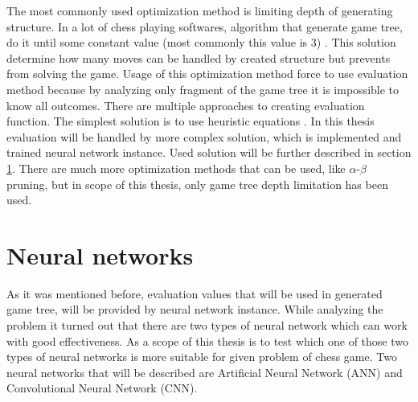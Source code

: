     The most commonly used optimization method is limiting depth of generating structure. In a lot of chess playing softwares, algorithm that generate game tree, do it until some constant value (most commonly this value is $3$) \cite{bib:internet-alphazero,bib:book-search-for-solutions-in-games,bib:article-optimal-on-game-trees}. This solution determine how many moves can be handled by created structure but prevents from solving the game. Usage of this optimization method force to use evaluation method because by analyzing only fragment of the game tree it is impossible to know all outcomes. There are multiple approaches to creating evaluation function. The simplest solution is to use heuristic equations \cite{bib:conference-heuristic-evaluation-chessai}. In this thesis evaluation will be handled by more complex solution, which is implemented and trained neural network instance. Used solution will be further described in section \ref{sec:neural-networks}. There are much more optimization methods that can be used, like $\alpha$-$\beta$ pruning, but in scope of this thesis, only game tree depth limitation has been used. 


    \section{Neural networks}\label{sec:neural-networks}
    As it was mentioned before, evaluation values that will be used in generated game tree, will be provided by neural network instance. While analyzing the problem it turned out that there are two types of neural network which can work with good effectiveness. As a scope of this thesis is to test which one of those two types of neural networks is more suitable for given problem of chess game. Two neural networks that will be described are Artificial Neural Network (ANN) and Convolutional Neural Network (CNN).

